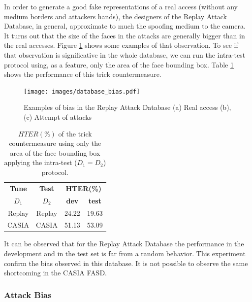 In order to generate a good fake representations of a real access (without any medium borders and attackers hands), the designers of the Replay Attack Database, in general, approximate to much the spoofing medium to the camera. It turns out that the size of the faces in the attacks are generally bigger than in the real accesses. Figure \ref{fig:database_bias} shows some examples of that observation. To see if that observation is significative in the whole database, we can run the intra-test protocol using, as a feature, only the area of the face bounding box. Table \ref{tb:TrickCounter} shows the performance of this trick countermeasure.

\begin{figure}[!btb]
\begin{center}
\texttt{[image: images/database\_bias.pdf]}
\caption[Examples of bias in the Replay Attack Database]{Examples of bias in the Replay Attack Database (a) Real access (b),(c) Attempt of attacks} 
\label{fig:database_bias}
\end{center}
\end{figure}


\begin{table}[ht!]
\caption{$HTER(\%)$ of the trick countermeasure using only the area of the face bounding box  applying the intra-test ($D_1 = D_2$) protocol.}
\begin{center}
  \begin{tabular}{ | c | c | c  c | }
    \hline

    \textbf{Tune} & \textbf{Test} & \multicolumn{2}{c|}{\textbf{HTER(\%)}} \\ 
     $D_1$ & $D_2$ & \textbf{dev} & \textbf{test}  \\ \hline
    
     Replay & Replay & 24.22 & 19.63  \\ 
     CASIA  & CASIA & 51.13 & 53.09  \\
    \hline
  \end{tabular}
\end{center}
\label{tb:TrickCounter}
\end{table}

It can be observed that for the Replay Attack Database the performance in the development and in the test set is far from a random behavior. This experiment confirm the bias observed in this database. It is not possible to observe the same shortcoming in the CASIA FASD. 

\subsubsection{Attack Bias}

